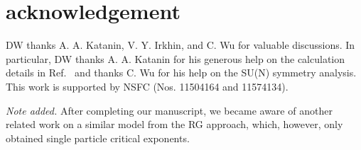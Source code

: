 \documentclass[aps,twocolumn,superscriptaddress]{revtex4-1}
\begin{document}
\section{acknowledgement}
DW thanks A. A. Katanin, V. Y. Irkhin, and C. Wu for valuable discussions. In particular, DW thanks A. A. Katanin for his generous help on the calculation details in Ref.~ and thanks C. Wu for his help on the SU(N) symmetry analysis. This work is supported by NSFC (Nos. 11504164 and 11574134).

{\it Note added.} After completing our manuscript, we became aware of another related work \cite{das2018} on a similar model from the RG approach, which, however, only obtained single particle critical exponents. 



\end{document}
